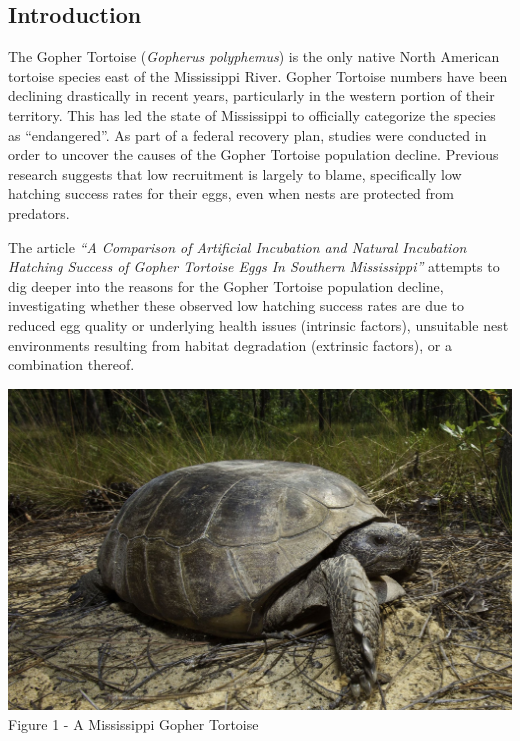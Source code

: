 \documentclass{article}
\newenvironment{Figure}
  {\par\medskip\noindent\minipage{\linewidth}}
  {\endminipage\par\medskip}
\begin{document}
\begin{multicols}{2}

\subsection*{Introduction}

The Gopher Tortoise (\textit{Gopherus polyphemus}) is the only native North American tortoise species east of the Mississippi River. Gopher Tortoise numbers have been declining drastically in recent years, particularly in the western portion of their territory. This has led the state of Mississippi to officially categorize the species as ``endangered''. As part of a federal recovery plan, studies were conducted in order to uncover the causes of the Gopher Tortoise population decline. Previous research suggests that low recruitment is largely to blame, specifically low hatching success rates for their eggs, even when nests are protected from predators.

The article \textit{``A Comparison of Artificial Incubation and Natural Incubation Hatching Success of Gopher Tortoise Eggs In Southern Mississippi''} \cite{source} attempts to dig deeper into the reasons for the Gopher Tortoise population decline, investigating whether these observed low hatching success rates are due to reduced egg quality or underlying health issues (intrinsic factors), unsuitable nest environments resulting from habitat degradation (extrinsic factors), or a combination thereof.

\begin{Figure}
    \centering
    \includegraphics[width=0.95\linewidth]{tortoise.jpg}
    Figure 1 - A Mississippi Gopher Tortoise \\ \cite{pic}
\end{Figure}


\end{multicols}
\end{document}

